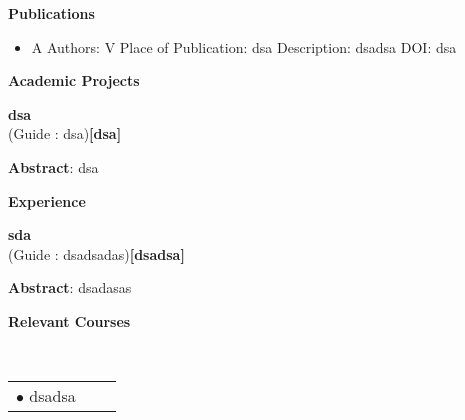 \documentclass[a4paper,10pt]{article}
\begin{document}
\colorbox{titleColor}{\parbox{6.7in}{\textbf{Publications}}} 

    \begin{itemize}

\setlength{\itemsep}{1pt}
\item A
\newline Authors: V
\newline Place of Publication: dsa
\newline Description: dsadsa
\newline DOI: dsa

\end{itemize}

\colorbox{titleColor}{\parbox{6.7in}{\textbf{Academic Projects}}}

\begin{itemize*}
\setlength{\itemsep}{1pt}
\item \textbf{dsa}
 \\ {(Guide : dsa)}\hfill {\small{{\textbf{[dsa]}}\/}}
\begin{itemize*}
\setlength{\itemsep}{.00pt}

            \item \textbf{Abstract}: dsa 

            \end{itemize*} 

            \end{itemize*} 

\colorbox{titleColor}{\parbox{6.7in}{\textbf{Experience}}}

\begin{itemize*}
\setlength{\itemsep}{1pt}
\item \textbf{sda}
 \\ {(Guide : dsadsadas)}\hfill {\small{{\textbf{[dsadsa]}}\/}}
\begin{itemize*}
\setlength{\itemsep}{.00pt}

            \item \textbf{Abstract}: dsadasas 

            \end{itemize*} 

            \end{itemize*} 

\colorbox{titleColor}{\parbox{6.7in}{\textbf{Relevant Courses}}}\\[0.08in]
    \begin{tabular}{p{3.5in}p{3in}p{2.5in}}
\hspace{0.9pc}$\bullet$ dsadsa
\end{tabular}
\end{document}
